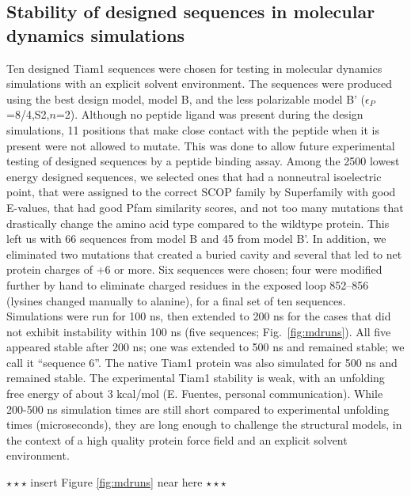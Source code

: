 \documentclass[12pt]{article}
\begin{document}
\subsection{Stability of designed sequences in molecular dynamics simulations}
Ten designed Tiam1 sequences were chosen for testing in molecular dynamics simulations with an explicit solvent environment. The
sequences were produced using the best design model, model B, and the less polarizable model B' ($\epsilon_P$=8/4,S2,$n$=2). Although
no peptide ligand was present during the design simulations, 11 positions that make close contact with the peptide when it is present
were not allowed to mutate. This was done to allow future experimental testing of designed sequences by a peptide binding assay.
Among the 2500 lowest energy designed sequences, we selected ones that had a nonneutral isoelectric point, that were assigned to
the correct SCOP family by Superfamily with good E-values, that had good Pfam similarity scores, and not too many mutations that
drastically change the amino acid type compared to the wildtype protein. This left us with 66 sequences from model B and 45 from
model B'. In addition, we eliminated two mutations that created a buried cavity and several that led to net protein charges of +6
or more. Six sequences were chosen; four were modified further by hand to eliminate charged residues in the exposed loop 852--856
(lysines changed manually to alanine), for a final set of ten sequences. Simulations were run for 100 ns, then extended to 200 ns
for the cases that did not exhibit instability within 100 ns (five sequences; Fig.\ \ref{fig:mdruns}). All five appeared stable
after 200 ns; one was extended to 500 ns and remained stable; we call it ``sequence 6''. The native Tiam1 protein was also simulated
for 500 ns and remained stable. The experimental Tiam1 stability is weak, with an unfolding free energy of about 3 kcal/mol (E. Fuentes,
personal communication). While 200-500 ns simulation times are still short compared to experimental unfolding times (microseconds),
they are long enough to challenge the structural models, in the context of a high quality protein force field and an explicit solvent
environment. 
\begin{center} $\star \star \star$ insert Figure \ref{fig:mdruns} near here $\star \star \star$ \end{center}
\end{document}
